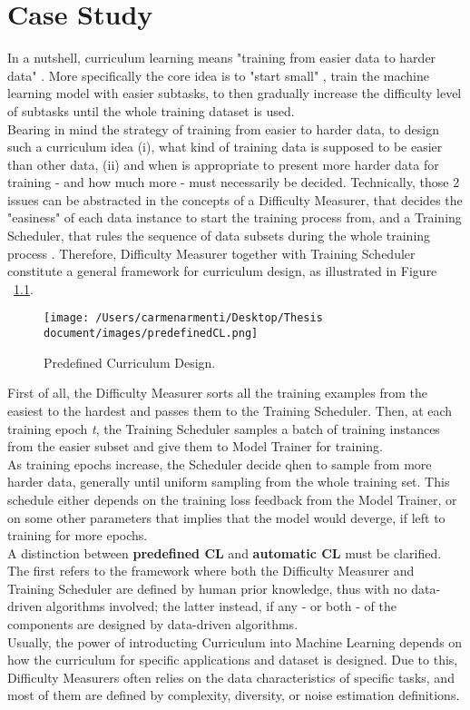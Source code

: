 \chapter{Case Study}
In a nutshell, curriculum learning means "training from easier data to harder data" \cite{Wang2020}. More specifically the
core idea is to "start small" \cite{ELMAN199371}, train the machine learning model with easier subtasks, to then gradually increase
the difficulty level of subtasks until the whole training dataset is used.\\
Bearing in mind the strategy of training from easier to harder data, to design such a curriculum idea 
(i), what kind of training data is supposed to be easier than other data, (ii) and when is appropriate to present more harder
data for training - and how much more - must necessarily be decided.
Technically, those 2 issues can be abstracted in the concepts of a Difficulty Measurer, that decides the "easiness"
of each data instance to start the training process from, and a Training Scheduler, that rules the sequence of data subsets during 
the whole training process \cite{Wang2020}.
Therefore, Difficulty Measurer together with Training Scheduler constitute a general framework for curriculum design,
as illustrated in Figure ~\ref{fig:CLdesign}.
\begin{figure}[h]
    \begin{center}
        \texttt{[image: /Users/carmenarmenti/Desktop/Thesis document/images/predefinedCL.png]}
        \caption{\label{fig:CLdesign}Predefined Curriculum Design.}
    \end{center}
\end{figure}
First of all, the Difficulty Measurer sorts all the training examples from the easiest 
to the hardest and passes them to the Training Scheduler. Then, at each training epoch \textit{t}, the Training Scheduler
samples a batch of training instances from the easier subset and give them to Model Trainer for training.\\
As training epochs increase, the Scheduler decide qhen to sample from more harder data, generally until uniform sampling
from the whole training set. This schedule either depends on the training loss feedback from the Model Trainer, or on some other
parameters that implies that the model would deverge, if left to training for more epochs.\\
A distinction between \textbf{predefined CL} and \textbf{automatic CL} must be clarified. The first refers to the framework
where both the Difficulty Measurer and Training Scheduler are defined by human prior knowledge, thus with no data-driven
algorithms involved; the latter instead, if any - or both - of the components are designed by data-driven algorithms.\\
Usually, the power of introducting Curriculum into Machine Learning depends on how the curriculum for specific
applications and dataset is designed. Due to this, Difficulty Measurers often relies on the data
characteristics of specific tasks, and most of them are defined by complexity, diversity, or noise estimation
definitions.\\

